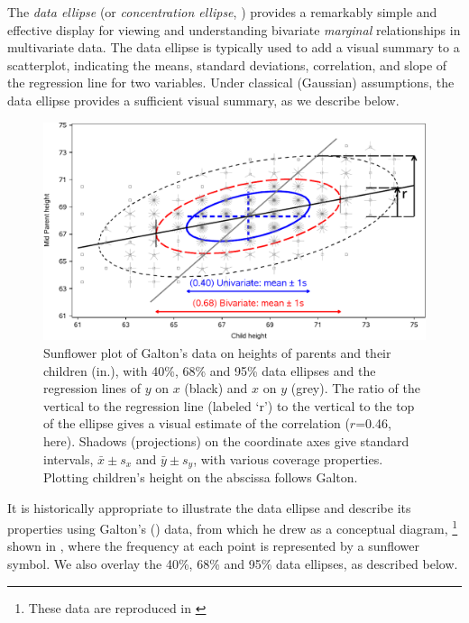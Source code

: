 
The \emph{data ellipse} \citep{Monette:90} (or \emph{concentration ellipse}, \citealp[Ch. 7]{Dempster:69})
provides a remarkably
simple and effective display for viewing and understanding
bivariate \emph{marginal} relationships in multivariate data.
The data ellipse is typically used to add a visual summary to a scatterplot,
indicating the means, standard deviations, correlation,
and slope of the regression line for
two variables. Under classical (Gaussian) assumptions, the data ellipse
provides a sufficient visual summary, as we describe below.


\begin{figure}[htb]
  \centering
  \includegraphics[width=.9\textwidth,clip]{fig/galton-reg3}
  \caption{Sunflower plot of Galton's data on heights of parents and their children (in.), with
  40\%, 68\% and 95\% data ellipses and the regression lines of $y$ on $x$ (black) and
  $x$ on $y$ (grey). The ratio of the vertical to the regression line (labeled `r') to the vertical
  to the top of the ellipse gives a visual estimate of the correlation ($r$=0.46, here).
  Shadows (projections) on the coordinate axes give standard intervals,
  $\bar{x} \pm s_x$ and $\bar{y} \pm s_y$, with various coverage properties.
  Plotting children's height on the abscissa follows Galton.
  }%
  \label{fig:galton-reg3}
\end{figure}

It is historically appropriate to illustrate the data ellipse and
describe its properties using Galton's (\citeyear[Table
I]{Galton:1886})
data, from which he drew  as a conceptual
diagram,%
\footnote{These data are reproduced in \citet[Table 8.2, p.
286]{Stigler:1986}}
shown in , where the frequency at
each point is represented by a sunflower symbol. We also overlay the 40\%,
68\% and 95\% data ellipses, as described below.


